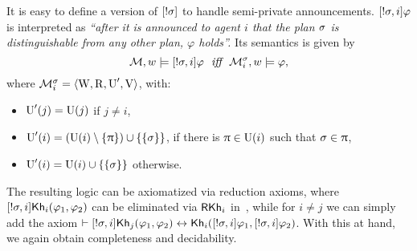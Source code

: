 It is easy to define a version of $[!\sigma]$ to handle semi-private announcements. $[!\sigma,i]\varphi$ is interpreted as \emph{``after it is announced to agent $i$ that the plan $\sigma$ is distinguishable from any other plan, $\varphi$ holds''.} Its semantics is given by 
\[
    \modults,w \models \srefbox{\plan,i}\varphi \ \ \iff \ \ \modults^\plan_i,w \models \varphi,
\]
where $\mathcal{M}^\sigma_i = \langle \operatorname{W},\operatorname{R},\operatorname{U}',\operatorname{V} \rangle$, with:
\begin{itemize}
\item $\operatorname{U}'(j) = \operatorname{U}(j)$ if $j \neq i$,
\item $\operatorname{U}'(i) = (\operatorname{U}(i) \setminus \{ \uppi \}) \cup \{ \{ \sigma \} \}$, if there is $\uppi \in \operatorname{U}(i)$ such that $\sigma \in \uppi$,
\item $\operatorname{U}'(i) = \operatorname{U}(i) \cup \{ \{ \sigma \} \}$ otherwise.
\end{itemize}   

\medskip 



The resulting logic can be axiomatized via reduction axioms, where $[!\sigma,i]{\sf Kh}_i(\varphi_1,\varphi_2)$ can be eliminated via $\textsf{RKh}_i$ in~, while for $i\neq j$ we can simply add the axiom $\vdash [!\sigma,i] {\sf Kh}_j(\varphi_1,\varphi_2) \leftrightarrow {\sf Kh}_i([!\sigma,i] \varphi_1,[!\sigma,i] \varphi_2)$. 
With this at hand, we again obtain completeness and decidability.
